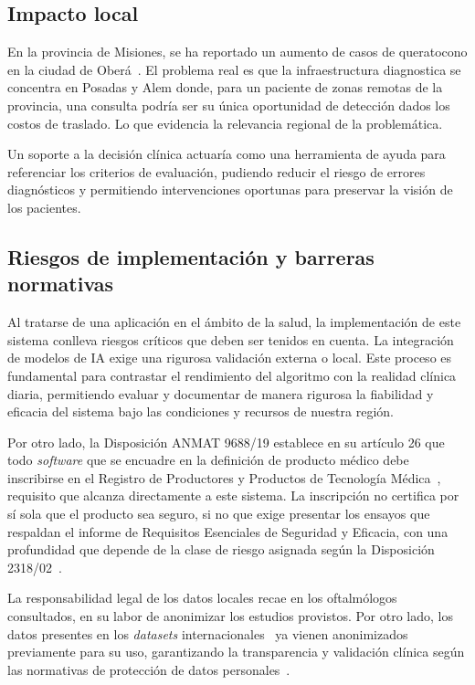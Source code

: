     \subsection*{Impacto local}
    
        En la provincia de Misiones, se ha reportado un aumento de casos de queratocono en la ciudad de Oberá~. El problema real es que la infraestructura diagnostica se concentra en Posadas y Alem donde, para un paciente de zonas remotas de la provincia, una consulta podría ser su única oportunidad de detección dados los costos de traslado. Lo que evidencia la relevancia regional de la problemática. 
        
        Un soporte a la decisión clínica actuaría como una herramienta de ayuda para referenciar los criterios de evaluación, pudiendo reducir el riesgo de errores diagnósticos y permitiendo intervenciones oportunas para preservar la visión de los pacientes.
        
    \subsection*{Riesgos de implementación y barreras normativas}
    
        Al tratarse de una aplicación en el ámbito de la salud, la implementación de este sistema conlleva riesgos críticos que deben ser tenidos en cuenta. La integración de modelos de IA exige una rigurosa validación externa o local. Este proceso es fundamental para contrastar el rendimiento del algoritmo con la realidad clínica diaria, permitiendo evaluar y documentar de manera rigurosa la fiabilidad y eficacia del sistema bajo las condiciones y recursos de nuestra región.
    
        Por otro lado, la Disposición ANMAT 9688/19 establece en su artículo 26 que todo \textit{software} que se encuadre en la definición de producto médico debe inscribirse en el Registro de Productores y Productos de Tecnología Médica~\cite{dispo_9688}, requisito que alcanza directamente a este sistema. La inscripción no certifica por sí sola que el producto sea seguro, si no que exige presentar los ensayos que respaldan el informe de Requisitos Esenciales de Seguridad y Eficacia, con una profundidad que depende de la clase de riesgo asignada según la Disposición 2318/02~\cite{dispo_2318}.
        
        La responsabilidad legal de los datos locales recae en los oftalmólogos consultados, en su labor de anonimizar los estudios provistos. Por otro lado, los datos presentes en los \textit{datasets} internacionales~ ya vienen anonimizados previamente para su uso, garantizando la transparencia y validación clínica según las normativas de protección de datos personales~.

